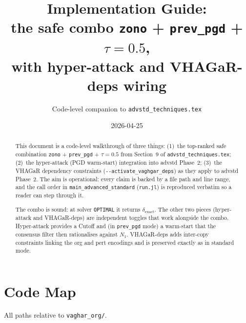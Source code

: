 \documentclass[11pt]{article}
\title{Implementation Guide: \\
  the safe combo \texttt{zono} + \texttt{prev\_pgd} + $\tau=0.5$, \\
  with hyper-attack and VHAGaR-deps wiring}
\author{Code-level companion to \texttt{advstd\_techniques.tex}}
\date{2026-04-25}
\newcommand{\src}[1]{\texttt{\small #1}}
\newcommand{\flag}[1]{\texttt{-{}-#1}}
\begin{document}
\maketitle

\begin{abstract}
This document is a code-level walkthrough of three things: (1)~the
top-ranked safe combination \texttt{zono} + \texttt{prev\_pgd} +
$\tau=0.5$ from Section~9 of \texttt{advstd\_techniques.tex}; (2)~the
hyper-attack (PGD warm-start) integration into advstd Phase~2;
(3)~the VHAGaR dependency constraints (\flag{activate\_vaghgar\_deps})
as they apply to advstd Phase~2. The aim is operational: every claim is
backed by a file path and line range, and the call order in
\src{main\_advanced\_standard} (\src{run.jl}) is reproduced verbatim so
a reader can step through it.

The combo is sound: at solver \texttt{OPTIMAL} it returns
$\delta_{\text{exact}}$. The other two pieces (hyper-attack and
VHAGaR-deps) are independent toggles that work alongside the combo.
Hyper-attack provides a Cutoff and (in \texttt{prev\_pgd} mode) a
warm-start that the consensus filter then rationalises against
$N_1$. VHAGaR-deps adds inter-copy constraints linking the org and
pert encodings and is preserved exactly as in standard mode.
\end{abstract}

\tableofcontents

\section{Code Map}
\label{sec:codemap}

All paths relative to \src{vaghar\_org/}.
\end{document}
